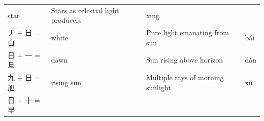 \begin{longtable}[]{@{}llll@{}}
\begin{minipage}[t]{0.19\columnwidth}
star\strut
\end{minipage} & \begin{minipage}[t]{0.33\columnwidth}\raggedright
Stars as celestial light producers\strut
\end{minipage} & \begin{minipage}[t]{0.19\columnwidth}\raggedright
xīng\strut
\end{minipage}\tabularnewline
\begin{minipage}[t]{0.19\columnwidth}\raggedright
丿 + 日 = 白\strut
\end{minipage} & \begin{minipage}[t]{0.19\columnwidth}\raggedright
white\strut
\end{minipage} & \begin{minipage}[t]{0.33\columnwidth}\raggedright
Pure light emanating from sun\strut
\end{minipage} & \begin{minipage}[t]{0.19\columnwidth}\raggedright
bái\strut
\end{minipage}\tabularnewline
\begin{minipage}[t]{0.19\columnwidth}\raggedright
日 + 一 = 旦\strut
\end{minipage} & \begin{minipage}[t]{0.19\columnwidth}\raggedright
dawn\strut
\end{minipage} & \begin{minipage}[t]{0.33\columnwidth}\raggedright
Sun rising above horizon\strut
\end{minipage} & \begin{minipage}[t]{0.19\columnwidth}\raggedright
dàn\strut
\end{minipage}\tabularnewline
\begin{minipage}[t]{0.19\columnwidth}\raggedright
九 + 日 = 旭\strut
\end{minipage} & \begin{minipage}[t]{0.19\columnwidth}\raggedright
rising sun\strut
\end{minipage} & \begin{minipage}[t]{0.33\columnwidth}\raggedright
Multiple rays of morning sunlight\strut
\end{minipage} & \begin{minipage}[t]{0.19\columnwidth}\raggedright
xù\strut
\end{minipage}\tabularnewline
\begin{minipage}[t]{0.19\columnwidth}\raggedright
日 + 十 = 早\strut
\end{minipage} & \begin{minipage}[t]{0.19\columnwidth}\raggedright

\end{minipage}
\end{longtable}
